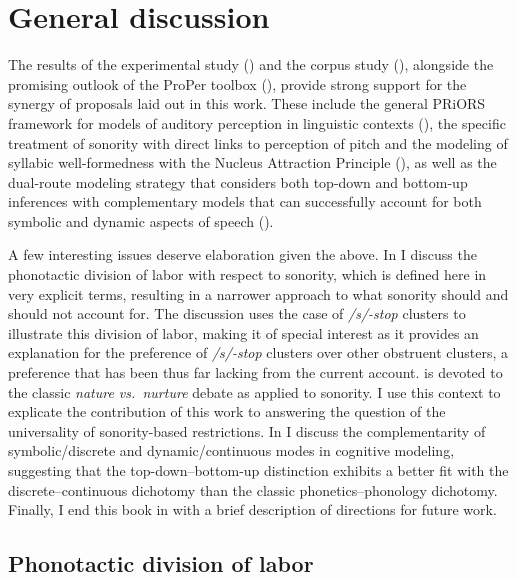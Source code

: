 \chapter{General discussion}\label{sec:genDiscussion}

The results of the experimental study () and the corpus study (), alongside the promising outlook of the ProPer toolbox (), provide strong support for the synergy of proposals laid out in this work. These include the general PRiORS framework for models of auditory perception in linguistic contexts (), the specific treatment of sonority with direct links to perception of pitch and the modeling of syllabic well-formedness with the Nucleus Attraction Principle (), as well as the dual-route modeling strategy that considers both top-down and bottom-up inferences with complementary models that can successfully account for both symbolic and dynamic aspects of speech ().

A few interesting issues deserve elaboration given the above.
In  I discuss the phonotactic division of labor with respect to sonority, which is defined here in very explicit terms, resulting in a narrower approach to what sonority should and should not account for. The discussion uses the case of \emph{/s/-stop} clusters to illustrate this division of labor, making it of special interest as it provides an explanation for the preference of \emph{/s/-stop} clusters over other obstruent clusters, a preference that has been thus far lacking from the current account.
 is devoted to the classic \emph{nature vs.~nurture} debate as applied to sonority. %
I use this context to explicate the contribution of this work to answering the question of %
the universality of sonority-based restrictions.
In  I discuss the complementarity of symbolic/discrete and dynamic/continuous modes in cognitive modeling, suggesting that the top-down--bottom-up distinction exhibits a better fit with the discrete--continuous dichotomy than the classic phonetics--phonology dichotomy.
Finally, I end this book in  with a brief description of directions for future work.

\section{Phonotactic division of labor}\label{sec:division}

